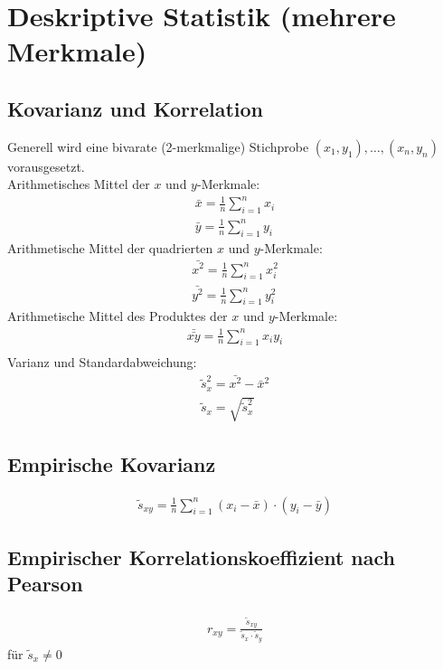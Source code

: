 \section{Deskriptive Statistik (mehrere Merkmale)}
\subsection{Kovarianz und Korrelation}
Generell wird eine bivarate (2-merkmalige) Stichprobe $(x_1,y_1),\dots,(x_n,y_n)$ vorausgesetzt. \\
Arithmetisches Mittel der $x$ und $y$-Merkmale:
\begin{align*}
  \bar{x} = \frac{1}{n} \sum^{n}_{i=1} x_i \\
  \bar{y} = \frac{1}{n} \sum^{n}_{i=1} y_i
\end{align*}
Arithmetische Mittel der quadrierten $x$ und $y$-Merkmale: 
\begin{align*}
  \bar{x^2} = \frac{1}{n} \sum^{n}_{i=1} x_i^2 \\
  \bar{y^2} = \frac{1}{n} \sum^{n}_{i=1} y_i^2
\end{align*}
Arithmetische Mittel des Produktes der $x$ und $y$-Merkmale:
\begin{align*}
  \bar{\bar{xy}} = \frac{1}{n} \sum^{n}_{i=1} x_i y_i \\
\end{align*}
Varianz und Standardabweichung:
\begin{align*}
  \tilde{s}^2_x = \bar{x^2} - \bar{x}^2 \\
  \tilde{s}_x = \sqrt{\tilde{s}^2_x}
\end{align*}
\subsection{Empirische Kovarianz}%
\label{sub:Empirische Kovarianz}
\begin{align*}
  \tilde{s}_{xy} = \frac{1}{n} \sum^{n}_{i=1} (x_i - \bar{x}) \cdot (y_i - \bar{y})
\end{align*}
\subsection{Empirischer Korrelationskoeffizient nach Pearson}%
\label{sub:Empirischer Korrelationskoeffizient nach Pearson}
\begin{align*}
  r_{xy} = \frac{\tilde{s}_{xy}}{\tilde{s}_x \cdot \tilde{s}_y} 
\end{align*}
für $\tilde{s}_x \neq 0$
